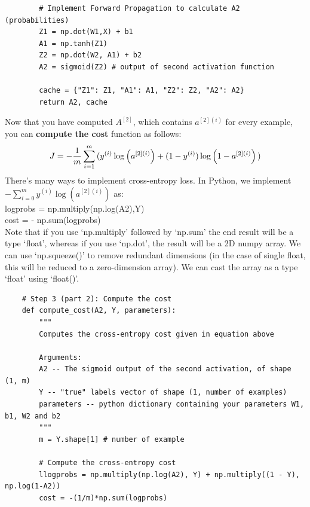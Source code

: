 \documentclass[11pt, a4paper]{article}
\begin{document}
\begin{spacing}{1.1}
\begin{lstlisting}
		# Implement Forward Propagation to calculate A2 (probabilities)
		Z1 = np.dot(W1,X) + b1
		A1 = np.tanh(Z1)
		Z2 = np.dot(W2, A1) + b2
		A2 = sigmoid(Z2) # output of second activation function
		
		cache = {"Z1": Z1, "A1": A1, "Z2": Z2, "A2": A2}
		return A2, cache \end{lstlisting} \newpage

	\noindent Now that you have computed $A^{[2]}$, which contains $a^{[2](i)}$ for every example, you can \textbf{compute the cost} function as follows:
	$$J = - \frac{1}{m} \sum\limits_{i = 1}^{m} \large{(} \small y^{(i)}\log\left(a^{[2] (i)}\right) + (1-y^{(i)})\log\left(1- a^{[2] (i)}\right) \large{)} \small$$
	There's many ways to implement cross-entropy loss. In Python, we implement $- \sum\limits_{i=0}^{m}  y^{(i)}\log(a^{[2](i)})$ as: \\
	logprobs = np.multiply(np.log(A2),Y) \\
	cost = - np.sum(logprobs) \vspace*{2mm} \\
	Note that if you use `np.multiply' followed by `np.sum' the end result will be a type `float', whereas if you use `np.dot', the result will be a 2D numpy array.  We can use `np.squeeze()' to remove redundant dimensions (in the case of single float, this will be reduced to a zero-dimension array). We can cast the array as a type `float' using `float()'.
	\begin{lstlisting}
	# Step 3 (part 2): Compute the cost
	def compute_cost(A2, Y, parameters):
		"""
		Computes the cross-entropy cost given in equation above
		
		Arguments:
		A2 -- The sigmoid output of the second activation, of shape (1, m)
		Y -- "true" labels vector of shape (1, number of examples)
		parameters -- python dictionary containing your parameters W1, b1, W2 and b2
		"""
		m = Y.shape[1] # number of example
		
		# Compute the cross-entropy cost
		llogprobs = np.multiply(np.log(A2), Y) + np.multiply((1 - Y), np.log(1-A2))
		cost = -(1/m)*np.sum(logprobs)


\end{lstlisting}
\end{spacing}
\end{document}
